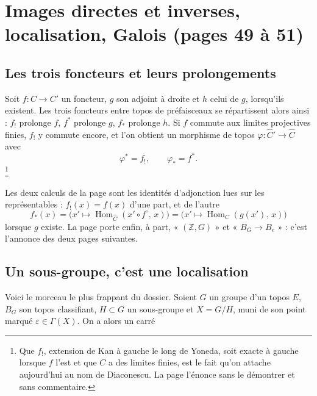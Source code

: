 \documentclass[11pt,a4paper]{article}
\begin{document}
\section*{Images directes et inverses, localisation, Galois (pages 49 à 51)}

\subsection*{Les trois foncteurs et leurs prolongements}

Soit $f : C \to C'$ un foncteur, $g$ son adjoint à droite et $h$ celui de $g$,
lorsqu'ils existent. Les trois foncteurs entre topos de préfaisceaux se
répartissent alors ainsi : $f_{!}$ prolonge $f$, $f^{*}$ prolonge $g$, $f_{*}$
prolonge $h$. Si $f$ commute aux limites projectives finies, $f_{!}$ y commute
encore, et l'on obtient un morphisme de topos $\varphi : \widehat{C}' \to
\widehat{C}$ avec
\[
\varphi^{*} = f_{!}, \qquad \varphi_{*} = f^{*}.
\]
\footnote{Que $f_{!}$, extension de Kan à gauche le long de Yoneda, soit exacte
à gauche lorsque $f$ l'est et que $C$ a des limites finies, est le fait qu'on
attache aujourd'hui au nom de Diaconescu. La page l'énonce sans le démontrer et
sans commentaire.}

Les deux calculs de la page sont les identités d'adjonction lues sur les
représentables : $f_{!}(x) = f(x)$ d'une part, et de l'autre
\[
f_{*}(x) = \bigl(x' \longmapsto \operatorname{Hom}_{\widehat{C}}
(x' \circ f^{\circ},\, x)\bigr)
= \bigl(x' \longmapsto \operatorname{Hom}_{C}(g(x'),\, x)\bigr)
\]
lorsque $g$ existe. La page porte enfin, à part, « $(\mathbb{Z}, G)$ » et
« $B_{G} \to B_{e}$ » : c'est l'annonce des deux pages suivantes.

\subsection*{Un sous-groupe, c'est une localisation}

Voici le morceau le plus frappant du dossier. Soient $G$ un groupe d'un topos
$E$, $B_{G}$ son topos classifiant, $H \subset G$ un sous-groupe et
$X = G/H$, muni de son point marqué $\varepsilon \in \Gamma(X)$. On a alors un
carré

\end{document}
